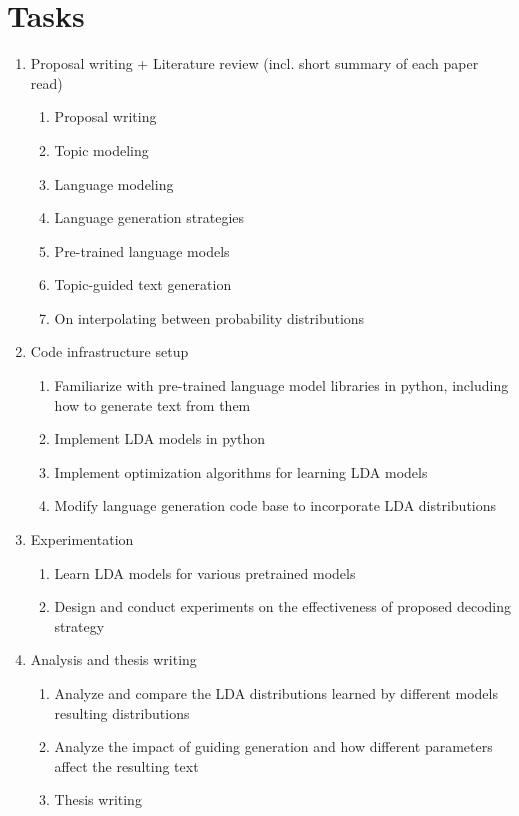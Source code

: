 \documentclass{article}
\begin{document}
\section{Tasks}
\begin{enumerate}
    \item Proposal writing + Literature review (incl. short summary of each paper read)
    \begin{enumerate}
        \item Proposal writing
        \item Topic modeling \cite{lda, topicnl, survey}
        \item Language modeling
        \item Language generation strategies
        \item Pre-trained language models \cite{ptm2020, bert, gpt2, gpt3, oppo}
        \item Topic-guided text generation \cite{topicaug, topicguided, topically}
        \item On interpolating between probability \cite{interpol} distributions
    \end{enumerate}
    \item Code infrastructure setup
    \begin{enumerate}
        \item Familiarize with pre-trained language model libraries in python, including how to generate text from them
        \item Implement LDA models in python
       \item Implement optimization algorithms for learning LDA models
       \item Modify language generation code base to incorporate LDA distributions
    \end{enumerate}
    \item Experimentation
    \begin{enumerate}
        \item Learn LDA models for various pretrained models
        \item Design and conduct experiments on the effectiveness of proposed decoding strategy
    \end{enumerate}
    \item Analysis and thesis writing
    \begin{enumerate}
        \item Analyze and compare the LDA distributions learned by different models resulting distributions
        \item Analyze the impact of guiding generation and how different parameters affect the resulting text
        \item Thesis writing
    \end{enumerate}
\end{enumerate}
\end{document}

